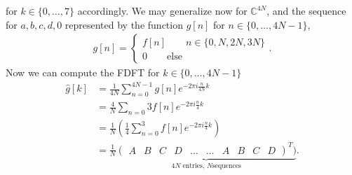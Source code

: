 for $k \in \{0,\dots, 7\}$ accordingly. We may generalize now for
$\mathbb{C}^{4N}$, and the sequence for $a, b, c, d, 0$ represented by the
function $g[n]$ for $n \in \{0,\dots, 4N-1\}$,
\begin{align}
    g[n] =\begin{cases}
        f[n] \qquad n\in \{0, N, 2N, 3N\}\\
        0 \qquad \text{else}
        \end{cases}.
\end{align}
Now we can compute the FDFT for $k \in \{0,\dots, 4N-1\}$
\begin{align}
    \hat{g}[k] &= \frac{1}{4N}\sum_{n=0}^{4N-1} g[n]e^{-2\pi i
    \frac{n}{4N}k}\\
         &=\frac{4}{N}\sum_{n=0}{3}f[n]e^{-2\pi i \frac{n}{4}k}\\
         &=\frac{1}{N}\left(\frac{1}{4}\sum_{n=0}^3 f[n] e^{-2\pi i
         \frac{n}{4}k} \right) \\
         &= \frac{1}{N} \underbrace{\begin{pmatrix}A & B & C & D & \dots &
             \dots & A & B & C & D\end{pmatrix}^T)}_{\text{$4N$ entries, $N$
         sequences}}.
\end{align}

